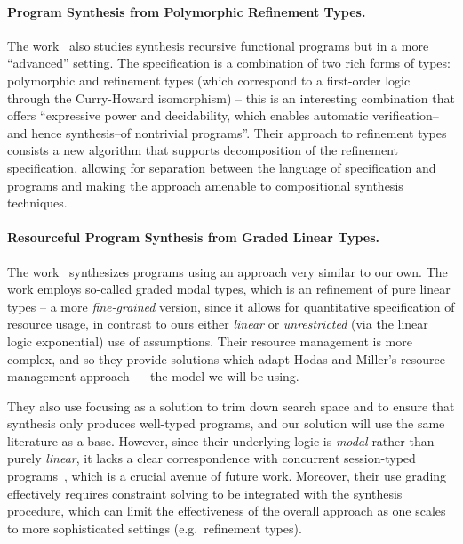 \documentclass{llncs}
\newcommand{\mypara}[1]{\paragraph{\textbf{#1}.}}
\begin{document}
  
\mypara{Program Synthesis from Polymorphic Refinement Types} The
work~\cite{DBLP:conf/pldi/PolikarpovaKS16} also studies synthesis
recursive functional programs but in a more ``advanced'' setting. The
specification is a combination of two rich forms of types: polymorphic and
refinement types (which correspond to a first-order logic through the
Curry-Howard isomorphism) -- this is an interesting combination that offers
``expressive power and decidability, which enables automatic
verification--and hence synthesis--of nontrivial programs''.  Their
approach to refinement types consists a new algorithm that supports
decomposition of the refinement specification, allowing for separation
between the language of specification and programs and making the
approach amenable to compositional synthesis techniques.

\mypara{Resourceful Program Synthesis from Graded Linear Types} The
work~\cite{DBLP:conf/lopstr/HughesO20} synthesizes programs using an
approach very similar to our own.  The work employs so-called graded
modal types, which is an refinement of pure linear types -- a more
\emph{fine-grained} version, since it allows for quantitative
specification of resource usage, in contrast to ours either
\emph{linear} or \emph{unrestricted} (via the linear logic
exponential) use of assumptions.  Their resource management is more
complex, and so they provide solutions which adapt Hodas and Miller's
resource management
approach~\cite{DBLP:journals/tcs/CervesatoHP00,DBLP:journals/tcs/LiangM09}
-- the model we will be using.

They also use focusing as a solution to trim down search space and to
ensure that synthesis only produces well-typed programs, and our
solution will use the same literature as a base.  However, since their
underlying logic is \emph{modal} rather than purely \emph{linear}, it
lacks a clear correspondence with concurrent session-typed
programs~\cite{DBLP:journals/mscs/CairesPT16,DBLP:conf/concur/CairesP10},
which is a crucial avenue of future work. Moreover, their use grading
effectively requires constraint solving to be integrated with the
synthesis procedure, which can limit the effectiveness of the overall
approach as one scales to more sophisticated settings (e.g.~refinement
types).

\end{document}
